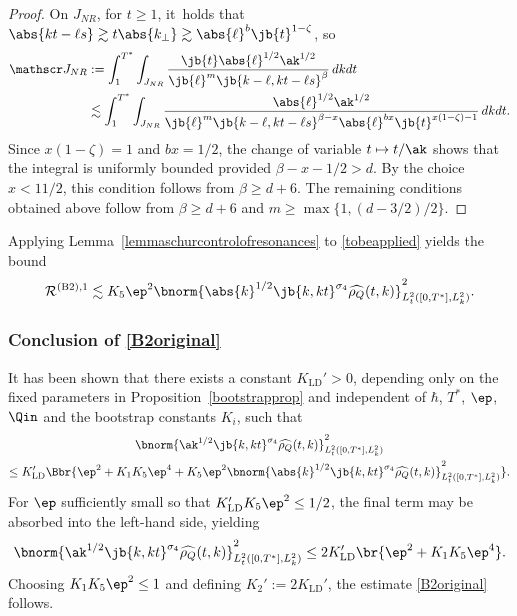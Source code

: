 \begin{proof}
On $J_{NR}$, for $t\geq1$, it~holds that $\abs{kt-\ell s}\gtrsim t\abs{k_\perp}\gtrsim\abs{\ell}^b\jb{t}^{1-\zeta}$, so
\begin{align*}
\mathscr J_{NR}&:=\int_1^{T^*}\int_{J_{NR}}\frac{\jb{t}\abs{\ell}^{1/2}\ak^{1/2}}{\jb{\ell}^m\jb{k-\ell,kt-\ell s}^{\beta}}\,dkdt\\
&\lesssim\int_1^{T^*}\int_{J_{NR}}\frac{\abs{\ell}^{1/2}\ak^{1/2}}{\jb{\ell}^m\jb{k-\ell,kt-\ell s}^{\beta-x}\abs{\ell}^{bx}\jb{t}^{x(1-\zeta)-1}}\,dkdt.
\end{align*}Since $x(1-\zeta)=1$ and $bx=1/2$, the change of variable $t\mapsto t/\ak$ shows that the integral is uniformly bounded provided $\beta-x-1/2>d$. By the choice $x<11/2$, this condition follows from $\beta\geq d+6$. The remaining conditions obtained above follow from $\beta\geq d+6$ and $m\geq\max\{1,(d-3/2)/2\}$.
\end{proof}
Applying Lemma~\ref{lemmaschurcontrolofresonances} to \eqref{tobeapplied} yields the bound
\begin{align*}\mathcal{R}^{\mathrm{(B2),1}}\lesssim K_5\ep^2\bnorm{\abs{k}^{1/2}\jb{k,kt}^{\sigma_4}\widehat{\rho_Q}(t,k)}_{L^2_{t}([0,T^*],L^2_k)}^2.\end{align*}

\subsubsection{Conclusion of \eqref{B2original}}
It has been shown that there exists a constant $K_{\mathrm{LD}}' >0$, depending only on the fixed parameters in Proposition~\ref{bootstrapprop} and independent of $\hbar$, $T^*$, $\ep$, $\Qin$ and the bootstrap constants $K_i$, such that
\begin{multline*}
\bnorm{\ak^{1/2}\jb{k,kt}^{\sigma_4}\widehat{\rho_Q}(t,k)}_{L^2_{t}([0,T^*],L^2_k)}^2\\
\leq K_{\mathrm{LD}}'\Bbr{\ep^2+K_1K_5\ep^4+K_5\ep^2\bnorm{\abs{k}^{1/2}\jb{k,kt}^{\sigma_4}\widehat{\rho_Q}(t,k)}_{L^2_{t}([0,T^*],L^2_k)}^2}.
\end{multline*}
For $\ep$ sufficiently small so that $K_{\mathrm{LD}}' K_5 \ep^2 \leq 1/2$, the final term may be absorbed into the left-hand side, yielding
\begin{align*}
\bnorm{\ak^{1/2}\jb{k,kt}^{\sigma_4}\widehat{\rho_Q}(t,k)}_{L^2_{t}([0,T^*],L^2_k)}^2\leq 2K_{\mathrm{LD}}'\br{\ep^2+K_1K_5\ep^4}.
\end{align*} Choosing $K_1 K_5 \ep^2 \leq 1$ and defining $K_2' := 2K_{\mathrm{LD}}'$, the estimate \eqref{B2original} follows.

